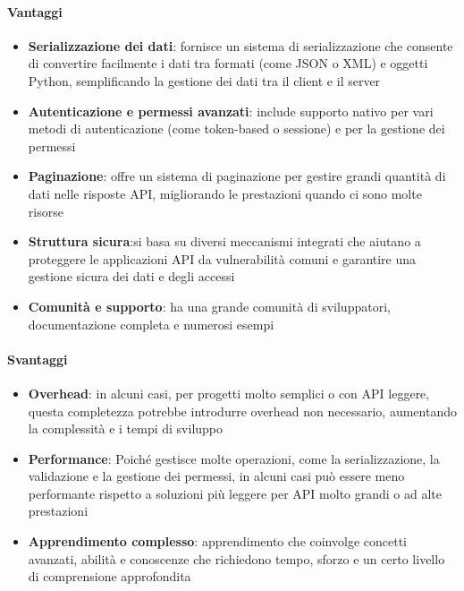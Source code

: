 \documentclass{article}
\begin{document}
\paragraph*{Vantaggi}
\begin{itemize}
    \item \textbf{Serializzazione dei dati}: fornisce un sistema di 
    serializzazione che consente di convertire facilmente i dati tra 
    formati (come JSON o XML) e oggetti Python, semplificando la 
    gestione dei dati tra il client e il server
    \item \textbf{Autenticazione e permessi avanzati}: include supporto 
    nativo per vari metodi di autenticazione (come token-based o 
    sessione) e per la gestione dei permessi
    \item \textbf{Paginazione}: offre un sistema di paginazione per 
    gestire grandi quantità di dati nelle risposte API, migliorando 
    le prestazioni quando ci sono molte risorse
    \item \textbf{Struttura sicura}:si basa su diversi meccanismi 
    integrati che aiutano a proteggere le applicazioni API da 
    vulnerabilità comuni e garantire una gestione sicura dei dati e 
    degli accessi
    \item \textbf{Comunità e supporto}: ha una grande comunità di 
    sviluppatori, documentazione completa e numerosi esempi
\end{itemize}
\paragraph*{Svantaggi}
\begin{itemize}
    \item \textbf{Overhead}: in alcuni casi, per progetti molto semplici 
    o con API leggere, questa completezza potrebbe introdurre overhead 
    non necessario, aumentando la complessità e i tempi di sviluppo
    \item \textbf{Performance}: Poiché  gestisce molte operazioni, come 
    la serializzazione, la validazione e la gestione dei permessi, in 
    alcuni casi può essere meno performante rispetto a soluzioni più 
    leggere per API molto grandi o ad alte prestazioni
    \item \textbf{Apprendimento complesso}: apprendimento che coinvolge 
    concetti avanzati, abilità e conoscenze che richiedono tempo, sforzo 
    e un certo livello di comprensione approfondita
\end{itemize}
\end{document}
